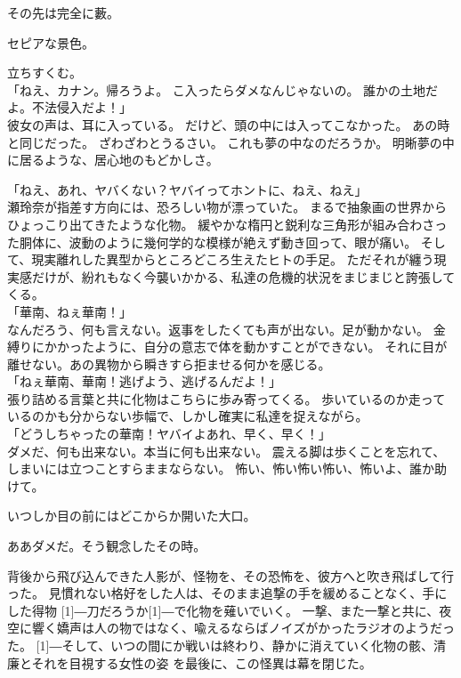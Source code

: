 \documentclass[../IHMain]{subfiles}
\begin{document}
その先は完全に藪。

セピアな景色。

立ちすくむ。\\
「ねえ、カナン。帰ろうよ。
こ入ったらダメなんじゃないの。
誰かの土地だよ。不法侵入だよ！」\\
彼女の声は、耳に入っている。
だけど、頭の中には入ってこなかった。
あの時と同じだった。
ざわざわとうるさい。
これも夢の中なのだろうか。
明晰夢の中に居るような、居心地のもどかしさ。


「ねえ、あれ、ヤバくない？ヤバイってホントに、ねえ、ねえ」\\
瀬玲奈が指差す方向には、恐ろしい物が漂っていた。
まるで抽象画の世界からひょっこり出てきたような化物。
緩やかな楕円と鋭利な三角形が組み合わさった胴体に、波動のように幾何学的な模様が絶えず動き回って、眼が痛い。
そして、現実離れした異型からところどころ生えたヒトの手足。
ただそれが纏う現実感だけが、紛れもなく今襲いかかる、私達の危機的状況をまじまじと誇張してくる。\\
「華南、ねぇ華南！」\\
なんだろう、何も言えない。返事をしたくても声が出ない。足が動かない。
金縛りにかかったように、自分の意志で体を動かすことができない。
それに目が離せない。あの異物から瞬きすら拒ませる何かを感じる。\\
「ねぇ華南、華南！逃げよう、逃げるんだよ！」\\
張り詰める言葉と共に化物はこちらに歩み寄ってくる。
歩いているのか走っているのかも分からない歩幅で、しかし確実に私達を捉えながら。\\
「どうしちゃったの華南！ヤバイよあれ、早く、早く！」\\
ダメだ、何も出来ない。本当に何も出来ない。
震える脚は歩くことを忘れて、しまいには立つことすらままならない。
怖い、怖い怖い怖い、怖いよ、誰か助けて。

いつしか目の前にはどこからか開いた大口。

ああダメだ。そう観念したその時。

背後から飛び込んできた人影が、怪物を、その恐怖を、彼方へと吹き飛ばして行った。
見慣れない格好をした人は、そのまま追撃の手を緩めることなく、手にした得物
\scalebox{3}[1]{―}刀だろうか\scalebox{3}[1]{―}で化物を薙いでいく。
一撃、また一撃と共に、夜空に響く嬌声は人の物ではなく、喩えるならばノイズがかったラジオのようだった。
\scalebox{3}[1]{―}そして、いつの間にか戦いは終わり、静かに消えていく化物の骸、清廉とそれを目視する女性の姿
を最後に、この怪異は幕を閉じた。
\end{document}
